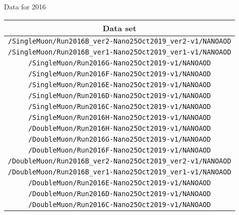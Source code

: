 Data for 2016
\begin{table}[!h]
\label{tab:datasets2016}
\begin{center}
{\footnotesize
\begin{tabular}{c}
\hline
Data set  \\
\hline
\texttt{/SingleMuon/Run2016B\_ver2-Nano25Oct2019\_ver2-v1/NANOAOD} \\
\texttt{/SingleMuon/Run2016B\_ver1-Nano25Oct2019\_ver1-v1/NANOAOD}   \\
\texttt{/SingleMuon/Run2016G-Nano25Oct2019-v1/NANOAOD} \\
\texttt{/SingleMuon/Run2016F-Nano25Oct2019-v1/NANOAOD} \\
\texttt{/SingleMuon/Run2016E-Nano25Oct2019-v1/NANOAOD} \\
\texttt{/SingleMuon/Run2016D-Nano25Oct2019-v1/NANOAOD} \\
\texttt{/SingleMuon/Run2016C-Nano25Oct2019-v1/NANOAOD} \\
\texttt{/SingleMuon/Run2016H-Nano25Oct2019-v1/NANOAOD} \\
\texttt{/DoubleMuon/Run2016H-Nano25Oct2019-v1/NANOAOD} \\
\texttt{/DoubleMuon/Run2016G-Nano25Oct2019-v1/NANOAOD} \\
\texttt{/DoubleMuon/Run2016F-Nano25Oct2019-v1/NANOAOD} \\
\texttt{/DoubleMuon/Run2016B\_ver2-Nano25Oct2019\_ver2-v1/NANOAOD} \\
\texttt{/DoubleMuon/Run2016B\_ver1-Nano25Oct2019\_ver1-v1/NANOAOD} \\
\texttt{/DoubleMuon/Run2016E-Nano25Oct2019-v1/NANOAOD} \\
\texttt{/DoubleMuon/Run2016D-Nano25Oct2019-v1/NANOAOD} \\
\texttt{/DoubleMuon/Run2016C-Nano25Oct2019-v1/NANOAOD} \\
\hline
\end{tabular}
} %
\end{center}
\end{table}

